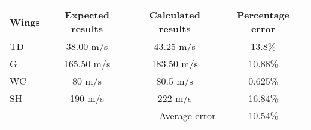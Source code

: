 \documentclass{standalone}
\begin{document}
    \centering
    \begin{tabular}{l c c c}
    \toprule
    \toprule
    Wings&Expected results&Calculated results&Percentage error\\
    \midrule
    TD & 38.00 m/s & 43.25 m/s & 13.8\% \\
    G & 165.50 m/s & 183.50 m/s & 10.88\% \\
    WC & 80 m/s & 80.5 m/s & 0.625\% \\
    SH & 190 m/s & 222 m/s & 16.84\%\\
    \midrule
    &\multicolumn{2}{r}{Average error} & 10.54\%\\
    \bottomrule
    \bottomrule
    \end{tabular}
    
\end{document}
